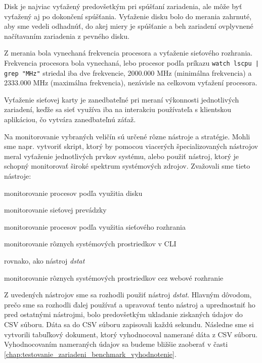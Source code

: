 Disk je najviac vyťažený predovšetkým pri spúšťaní zariadenia, ale môže byť vyťažený aj po dokončení spúšťania. Vyťaženie disku bolo do merania zahrnuté, aby sme vedeli odhadnúť, do akej miery je spúšťanie a beh zariadení ovplyvnené načítavaním zariadenia z pevného disku.

Z merania bola vynechaná frekvencia procesora a vyťaženie sieťového rozhrania. Frekvencia procesora bola vynechaná, lebo procesor podľa príkazu \texttt{watch lscpu | grep "MHz"} striedal iba dve frekvencie, 2000.000 MHz (minimálna frekvencia) a 2333.000 MHz (maximálna frekvencia), nezávisle na celkovom vyťažení procesora.

Vyťaženie sieťovej karty je zanedbateľné pri meraní výkonnosti jednotlivých zariadení, keďže sa sieť využíva iba na interakciu používateľa s klientskou aplikáciou, čo vytvára zanedbateľnú záťaž.

Na monitorovanie vybraných veličín sú určené rôzne nástroje a stratégie. Mohli sme napr. vytvoriť skript, ktorý by pomocou viacerých špecializovaných nástrojov meral vyťaženie jednotlivých prvkov systému, alebo použiť nástroj, ktorý je schopný monitorovať široké spektrum systémových zdrojov. Zvažovali sme tieto nástroje:

\begin{description}[noitemsep]
    \item [iotop] monitorovanie procesov podľa využitia disku
    \item [nmap] monitorovanie sieťovej prevádzky
    \item [nethogs] monitorovanie procesov podľa využitia sieťového rozhrania
    \item [dstat] monitorovanie rôznych systémových prostriedkov v CLI
    \item [sysstat] rovnako, ako nástroj \emph{dstat}
    \item [netdata] monitorovanie rôznych systémových prostriedkov cez webové rozhranie
\end{description}

Z uvedených nástrojov sme sa rozhodli použiť nástroj \emph{dstat}. Hlavným dôvodom, prečo sme sa rozhodli ďalej používať a upravovať tento nástroj a uprednostniť ho pred ostatnými nástrojmi, bolo predovšetkým ukladanie ziskaných údajov do CSV súboru. Dáta sa do CSV súboru zapisovali každú sekundu. Následne sme si vytvorili tabuľkový dokument, ktorý vyhodnocoval namerané dáta z CSV súboru. Vyhodnocovaním nameraných údajov sa budeme bližšie zaoberať v časti \ref{chap:testovanie_zariadeni_benchmark_vyhodnotenie}.

